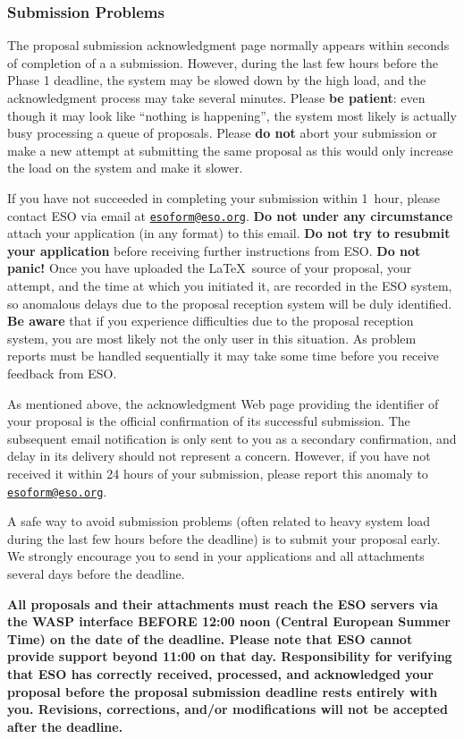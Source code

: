 \documentclass{article}
\begin{document}
\subsubsection*{Submission Problems} 
The proposal submission
acknowledgment page normally appears within seconds of completion of a
a submission. However, during the last few hours before the Phase 1
deadline, the system may be slowed down by the high load, and the
acknowledgment process may take several minutes. Please {\bf be
  patient}: even though it may look like ``nothing is happening'', the
system most likely is actually busy processing a queue of
proposals. Please {\bf do not} abort your submission or make a new
attempt at submitting the same proposal as this would only increase the
load on the system and make it slower. 

If you have not succeeded in completing your submission within 1~hour, 
please contact ESO via email  
at \href{mailto:esoform@eso.org}{\tt esoform@eso.org}.
{\bf Do not under any circumstance} attach your application (in any
format) to this email. {\bf Do not try to resubmit your application}
before receiving further instructions from ESO. {\bf Do not panic!}
Once you have uploaded the \LaTeX\ source of your proposal, your
attempt, and the time at which you initiated it, are recorded in the
ESO system, so anomalous delays due to the proposal reception
system will be duly identified. {\bf Be aware} that if you experience
difficulties due to the proposal reception system, you are most likely 
not the only user in this situation. As problem reports must be
handled sequentially it may take some time before you receive
feedback from ESO.  

As mentioned above, the acknowledgment Web page providing the
identifier of your proposal is the official confirmation of its
successful submission. The subsequent email notification is only sent
to you as a secondary confirmation, and delay in its delivery should
not represent a concern. However, if you have not received
it within 24 hours of your submission, please report this anomaly to  
\href{mailto:esoform@eso.org}{\tt esoform@eso.org}. 

A safe way to avoid submission problems (often related to heavy
system load  during the last few hours before the deadline) is to submit your
proposal early.  We strongly encourage you to send in your
applications and all attachments several days before the deadline.
  
\vspace*{1cm} {\bf All proposals and their attachments must reach the
  ESO servers via the WASP interface BEFORE 12:00 noon (Central
  European Summer Time) on the date of the deadline. Please note that  
  ESO cannot provide support beyond 11:00 on that day. 
  Responsibility for 
  verifying that ESO has correctly received, processed, and
  acknowledged your proposal before the proposal submission deadline
  rests entirely with you.  Revisions, corrections, and/or
  modifications will not be accepted after the deadline.}
\end{document}
